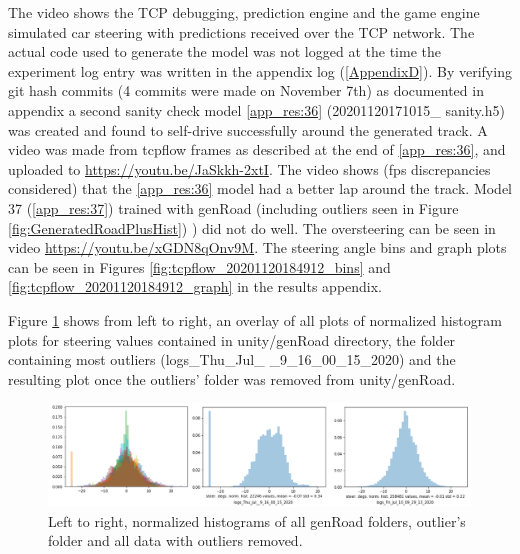 The video shows the TCP debugging, prediction engine and the game engine simulated car steering with predictions received over the TCP network. The actual code used to generate the model was not logged at the time the experiment log entry was written in the appendix log (\ref{AppendixD}). By verifying git hash commits (4 commits were made on November 7th) as documented in appendix  a second sanity check model \ref{app_res:36} (20201120171015\_ sanity.h5) was created and found to self-drive successfully around the generated track. A video was made from tcpflow frames as described at the end of \ref{app_res:36}, and uploaded to \href{https://youtu.be/JaSkkh-2xtI}{https://youtu.be/JaSkkh-2xtI}.
The video shows (fps discrepancies considered) that the \ref{app_res:36} model had a better lap around the track.
Model 37 (\ref{app_res:37}) trained with genRoad (including outliers seen in Figure \ref{fig:GeneratedRoadPlusHist}) ) did not do well. The oversteering can be seen in video \href{https://youtu.be/xGDN8qOnv9M}{https://youtu.be/xGDN8qOnv9M}. The steering angle bins and graph plots can be seen in  Figures \ref{fig:tcpflow_20201120184912_bins}  and \ref{fig:tcpflow_20201120184912_graph} in the results appendix.


Figure \ref{fig:SkewCleanup} shows from left to right, an overlay of all plots of normalized histogram plots for steering values contained in unity/genRoad directory, the folder containing most outliers (logs\_Thu\_Jul\_ \_9\_16\_00\_15\_2020) and the resulting plot once the outliers' folder was removed from unity/genRoad. 

\begin{figure}[h!]
\centering
\includegraphics[width=\textwidth]{Figures/SkewCleanup.png}
\caption{Left to right, normalized histograms of all genRoad folders, outlier's folder and all data with outliers removed.}
\label{fig:SkewCleanup}
\end{figure}

